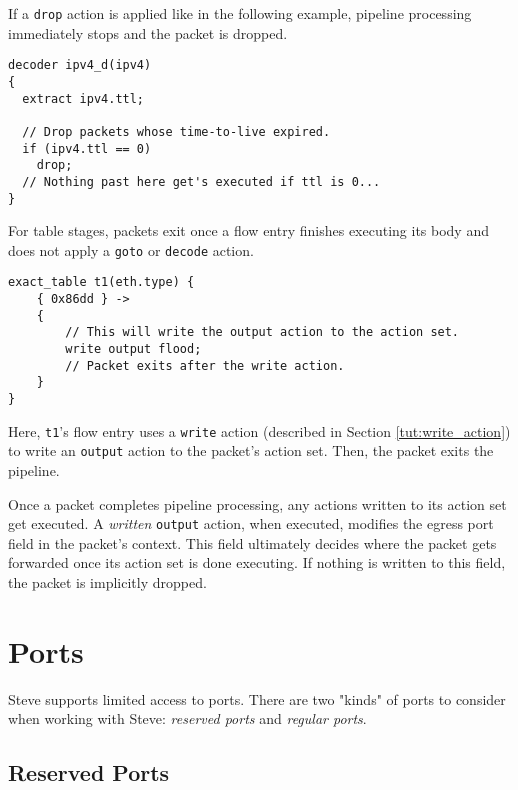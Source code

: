 If a \texttt{drop} action is applied like in the following example, pipeline processing
immediately stops and the packet is dropped.

\begin{codepage}
\begin{lstlisting}
decoder ipv4_d(ipv4)
{
  extract ipv4.ttl;

  // Drop packets whose time-to-live expired.
  if (ipv4.ttl == 0)
  	drop;
  // Nothing past here get's executed if ttl is 0...
}
\end{lstlisting}
\end{codepage}

For table stages, packets exit once a flow entry finishes executing its body and
does not apply a \texttt{goto} or \texttt{decode} action.

\begin{codepage}
\begin{lstlisting}
exact_table t1(eth.type) {
	{ 0x86dd } ->
	{
		// This will write the output action to the action set.
		write output flood;
		// Packet exits after the write action.
	}
}
\end{lstlisting}
\end{codepage}

Here, \texttt{t1}'s flow entry uses a \texttt{write} action (described in Section
\ref{tut:write_action}) to write an \texttt{output} action to the packet's action set.
Then, the packet exits the pipeline.

Once a packet completes pipeline processing, any actions written to its action
set get executed. A \textit{written} \texttt{output} action, when executed, modifies the
egress port field in the packet's context. This field ultimately decides where
the packet gets forwarded once its action set is done executing. If nothing is
written to this field, the packet is implicitly dropped.

\section{Ports} \label{tut:ports}

Steve supports limited access to ports.
There are two "kinds" of ports to consider when working with Steve: \textit{reserved ports} and
\textit{regular ports}.

\subsection {Reserved Ports} \label{tut:reserved_ports}

